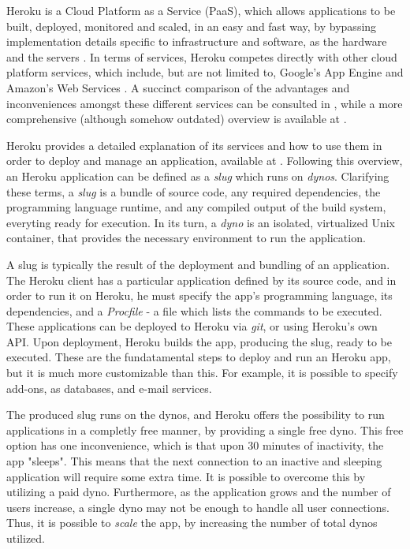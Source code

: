
Heroku is a Cloud Platform as a Service (PaaS), which allows applications to be built, deployed, monitored and scaled,
in an easy and fast way, by bypassing implementation details specific to infrastructure and software, as the hardware and the servers \cite{heroku_what}.
In terms of services, Heroku competes directly with other cloud platform services, 
which include, but are not limited to, Google's App Engine \cite{google_app} and Amazon's Web Services \cite{amazon_web}.
A succinct comparison of the advantages and inconveniences amongst these different services can be consulted in \cite{cloud_comparison},
while a more comprehensive (although somehow outdated) overview is available at \cite{cloud_article}.

Heroku provides a detailed explanation of its services and how to use them in order to deploy and manage an application,
available at \cite{heroku_how}. Following this overview, an Heroku application can be defined as a \textit{slug} which runs on \textit{dynos}.
Clarifying these terms, a \textit{slug} is a bundle of source code, any required dependencies, the programming language runtime,
and any compiled output of the build system, everyting ready for execution. In its turn, a \textit{dyno} is an isolated, virtualized Unix container,
that provides the necessary environment to run the application. 

A slug is typically the result of the deployment and bundling of an application. The Heroku client has a particular application defined by its source code,
and in order to run it on Heroku, he must specify the app's programming language, its dependencies, and a \textit{Procfile} - a file which lists the 
commands to be executed. These applications can be deployed to Heroku via \textit{git}, or using Heroku's own API. Upon deployment,
Heroku builds the app, producing the slug, ready to be executed. These are the fundatamental steps to deploy and run an Heroku app,
but it is much more customizable than this. For example, it is possible to specify add-ons, as databases, and e-mail services.

The produced slug runs on the dynos, and Heroku offers the possibility to run applications in a completly free manner, by providing a single free dyno. 
This free option has one inconvenience, which is that upon 30 minutes of inactivity, the app "sleeps". This means that the next connection 
to an inactive and sleeping application will require some extra time. It is possible to overcome this by utilizing a paid dyno. 
Furthermore, as the application grows and the number of users increase, a single dyno may not be enough 
to handle all user connections. Thus, it is possible to \textit{scale} the app, by increasing the number of total dynos utilized.

